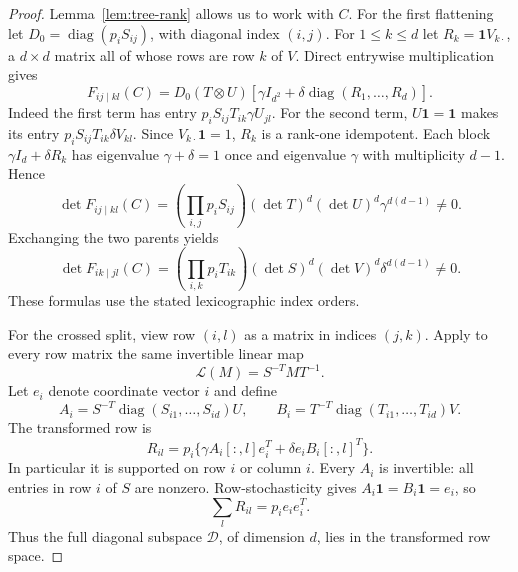 \documentclass[11pt]{article}
\theoremstyle{definition}
\theoremstyle{remark}
\DeclareMathOperator{\diag}{diag}
\newcommand{\one}{\mathbf 1}
\begin{document}
\begin{proof}
Lemma~\ref{lem:tree-rank} allows us to work with $C$.
For the first flattening let $D_0=\diag(p_iS_{ij})$, with diagonal index
$(i,j)$. For $1\le k\le d$ let
$R_k=\one V_{k\cdot}$, a $d\times d$ matrix all of whose rows are row $k$
of $V$. Direct entrywise multiplication gives
\begin{equation}\label{eq:det-factor}
 F_{ij\mid kl}(C)=D_0(T\otimes U)
                 \left[\gamma I_{d^2}+
                       \delta\diag(R_1,\ldots,R_d)\right].
\end{equation}
Indeed the first term has entry
$p_iS_{ij}T_{ik}\gamma U_{jl}$. For the second term,
$U\one=\one$ makes its entry $p_iS_{ij}T_{ik}\delta V_{kl}$.
Since $V_{k\cdot}\one=1$, $R_k$ is a rank-one idempotent.
Each block $\gamma I_d+\delta R_k$ has eigenvalue $\gamma+\delta=1$
once and eigenvalue $\gamma$ with multiplicity $d-1$. Hence
\begin{equation}\label{eq:first-determinant}
 \det F_{ij\mid kl}(C)=
 \left(\prod_{i,j}p_iS_{ij}\right)
 (\det T)^d(\det U)^d\gamma^{d(d-1)}\ne0.
\end{equation}
Exchanging the two parents yields
\begin{equation}\label{eq:second-determinant}
 \det F_{ik\mid jl}(C)=
 \left(\prod_{i,k}p_iT_{ik}\right)
 (\det S)^d(\det V)^d\delta^{d(d-1)}\ne0.
\end{equation}
These formulas use the stated lexicographic index orders.

For the crossed split, view row $(i,l)$ as a matrix in indices $(j,k)$.
Apply to every row matrix the same invertible linear map
\[
 \mathcal L(M)=S^{-T}MT^{-1}.
\]
Let $e_i$ denote coordinate vector $i$ and define
\begin{equation}\label{eq:AiBi}
 A_i=S^{-T}\diag(S_{i1},\ldots,S_{id})U,
 \qquad B_i=T^{-T}\diag(T_{i1},\ldots,T_{id})V.
\end{equation}
The transformed row is
\begin{equation}\label{eq:row-star}
 R_{il}=p_i\{\gamma A_i[:,l]e_i^T+
                   \delta e_iB_i[:,l]^T\}.
\end{equation}
In particular it is supported on row $i$ or column $i$.
Every $A_i$ is invertible: all entries in row $i$ of $S$ are nonzero.
Row-stochasticity gives $A_i\one=B_i\one=e_i$, so
\begin{equation}\label{eq:diagonal-aggregate}
 \sum_l R_{il}=p_i e_ie_i^T.
\end{equation}
Thus the full diagonal subspace $\mathcal D$, of dimension $d$, lies in
the transformed row space.


\end{proof}
\end{document}
